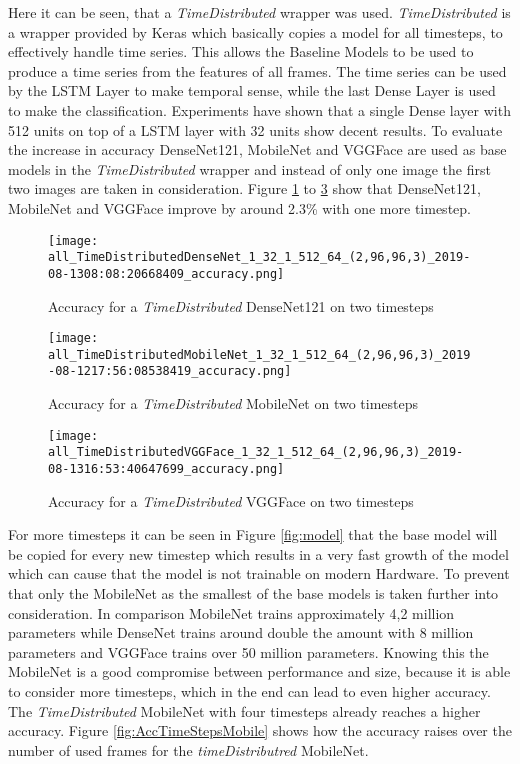Here it can be seen, that a \emph{TimeDistributed} wrapper was used.
\emph{TimeDistributed} is a wrapper provided by Keras which basically copies a model for all timesteps, to effectively handle time series.
This allows the Baseline Models to be used to produce a time series from the features of all frames. 
The time series can be used by the LSTM Layer to make temporal sense, while the last Dense Layer is used to make the classification.
Experiments have shown that a single Dense layer with 512 units on top of a LSTM layer with 32 units show decent results.
To evaluate the increase in accuracy DenseNet121, MobileNet and VGGFace are used as base models in the \emph{TimeDistributed} wrapper and instead of only one image the first two images are taken in consideration.
Figure \ref{fig:tD2Dense} to \ref{fig:tD2VGGFace} show that DenseNet121, MobileNet and VGGFace improve by around 2.3\% with one more timestep.

\begin{figure}
  \centering
  \texttt{[image: all\_TimeDistributedDenseNet\_1\_32\_1\_512\_64\_(2,96,96,3)\_2019-08-1308:08:20668409\_accuracy.png]}
  \caption{Accuracy for a \emph{TimeDistributed} DenseNet121 on two timesteps}
  \label{fig:tD2Dense}
\end{figure}

\begin{figure}
  \centering
  \texttt{[image: all\_TimeDistributedMobileNet\_1\_32\_1\_512\_64\_(2,96,96,3)\_2019-08-1217:56:08538419\_accuracy.png]}
  \caption{Accuracy for a \emph{TimeDistributed} MobileNet on two timesteps}
  \label{fig:tD2Mobile}
\end{figure}

\begin{figure}
  \centering
  \texttt{[image: all\_TimeDistributedVGGFace\_1\_32\_1\_512\_64\_(2,96,96,3)\_2019-08-1316:53:40647699\_accuracy.png]}
  \caption{Accuracy for a \emph{TimeDistributed} VGGFace on two timesteps}
  \label{fig:tD2VGGFace}
\end{figure}

For more timesteps it can be seen in Figure \ref{fig:model} that the base model will be copied for every new timestep which results in a very fast growth of the model which can cause that the model is not trainable on modern Hardware.
To prevent that only the MobileNet as the smallest of the base models is taken further into consideration.
In comparison MobileNet trains approximately 4,2 million parameters while DenseNet trains around double the amount with 8 million parameters and VGGFace trains over 50 million parameters.
Knowing this the MobileNet is a good compromise between performance and size, because it is able to consider more timesteps, which in the end can lead to even higher accuracy.
The \emph{TimeDistributed} MobileNet with four timesteps already reaches a higher accuracy. Figure \ref{fig:AccTimeStepsMobile} shows how the accuracy raises over the number of used frames for the \emph{timeDistributred} MobileNet.

